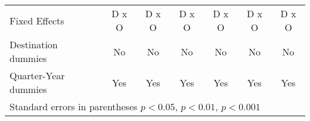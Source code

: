 \begin{table}[!ht]
\begin{tabular}{l*{6}{c}}
Fixed Effects       &       D x O         &       D x O         &       D x O         &       D x O         &       D x O         &       D x O         \\
Destination dummies &          No         &          No         &          No         &          No         &          No         &          No         \\
Quarter-Year dummies&         Yes         &         Yes         &         Yes         &         Yes         &         Yes         &         Yes         \\
\hline\hline
\multicolumn{7}{l}{ Standard errors in parentheses \sym{*} \(p<0.05\), \sym{**} \(p<0.01\), \sym{***} \(p<0.001\)}\\
\end{tabular}
\end{table}
